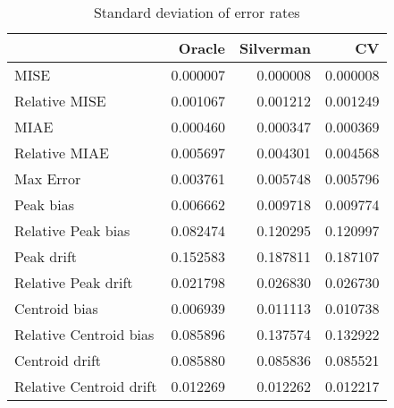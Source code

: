 \begin{table}[H]
\centering
\begin{tabular}{lrrr}
  \hline
 & Oracle & Silverman & CV \\ 
  \hline
MISE & 0.000007 & 0.000008 & 0.000008 \\ 
  Relative MISE & 0.001067 & 0.001212 & 0.001249 \\ 
  MIAE & 0.000460 & 0.000347 & 0.000369 \\ 
  Relative MIAE & 0.005697 & 0.004301 & 0.004568 \\ 
  Max Error & 0.003761 & 0.005748 & 0.005796 \\ 
  Peak bias & 0.006662 & 0.009718 & 0.009774 \\ 
  Relative Peak bias & 0.082474 & 0.120295 & 0.120997 \\ 
  Peak drift & 0.152583 & 0.187811 & 0.187107 \\ 
  Relative Peak drift & 0.021798 & 0.026830 & 0.026730 \\ 
  Centroid bias & 0.006939 & 0.011113 & 0.010738 \\ 
  Relative Centroid bias & 0.085896 & 0.137574 & 0.132922 \\ 
  Centroid drift & 0.085880 & 0.085836 & 0.085521 \\ 
  Relative Centroid drift & 0.012269 & 0.012262 & 0.012217 \\ 
   \hline
\end{tabular}
\caption{Standard deviation of error rates} 
\label{tbl:stddev_error_rates}
\end{table}
